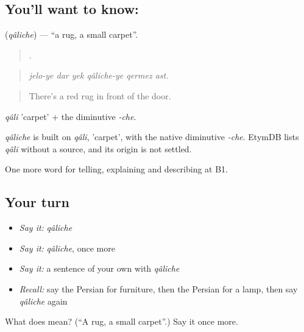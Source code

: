 \subsection*{You'll want to know: }
\textbf{} (\emph{qâliche}) — \textquotedblleft{}a rug, a small carpet\textquotedblright{}.

\begin{quote}
     .
\end{quote}

\begin{quote}
\emph{jelo-ye dar yek qâliche-ye qermez ast.}
\end{quote}

\begin{quote}
There's a red rug in front of the door.
\end{quote}

\emph{qâli} 'carpet' + the diminutive \emph{-che}.

\begin{cousinweb}
\emph{qâliche} is built on \emph{qâli}, 'carpet', with the native diminutive \emph{-che}. EtymDB lists \emph{qâli} without a source, and its origin is not settled.
\end{cousinweb}

\begin{grammarlens}[title={What you've built}]
One more word for telling, explaining and describing at B1.
\end{grammarlens}

\subsection*{Your turn}
\begin{itemize}
\raggedright
  \item \emph{Say it:} \emph{qâliche}
  \item \emph{Say it:} \emph{qâliche}, once more
  \item \emph{Say it:} a sentence of your own with \emph{qâliche}
  \item \emph{Recall:} say the Persian for furniture, then the Persian for a lamp, then say \emph{qâliche} again
\end{itemize}

\begin{tcolorbox}[breakable,colback=teal!4,colframe=teal!35!black,title={Before you move on}]
What does  mean? (\textquotedblleft{}A rug, a small carpet\textquotedblright{}.) Say it once more.
\end{tcolorbox}
